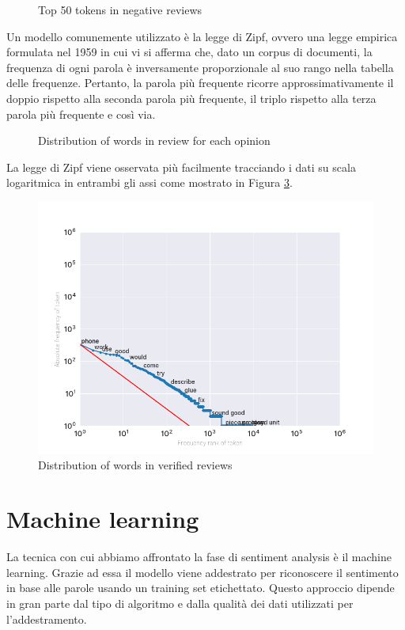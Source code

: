 \begin{figure}[H]
  \centering
  
  \caption{Top 50 tokens in negative reviews}
  \label{50_neg}
\end{figure}

Un modello comunemente utilizzato è la legge di Zipf, ovvero una legge empirica formulata nel 1959 in cui vi si afferma che, dato un corpus di documenti, la frequenza di ogni parola è inversamente proporzionale al suo rango nella tabella delle frequenze. Pertanto, la parola più frequente ricorre approssimativamente il doppio rispetto alla seconda parola più frequente, il triplo rispetto alla terza parola più frequente e così via.

\begin{figure}[H]
  \centering
  
  \caption{Distribution of words in review for each opinion}
  \label{distribution_words_opinion}
\end{figure}

La legge di Zipf viene osservata più facilmente tracciando i dati su scala logaritmica in entrambi gli assi come mostrato in Figura \ref{zipf_law}.

\begin{figure}[H]
  \centering
  \captionsetup{margin=1cm}
  \includegraphics[width=0.8\linewidth]{figures/2_zipf_law.png}
  \caption{Distribution of words in verified reviews}
  \label{zipf_law}
\end{figure}


\section{Machine learning}
La tecnica con cui abbiamo affrontato la fase di sentiment analysis è il machine learning. Grazie ad essa il modello viene addestrato per riconoscere il sentimento in base alle parole usando un training set etichettato. Questo approccio dipende in gran parte dal tipo di algoritmo e dalla qualità dei dati utilizzati per l'addestramento.

